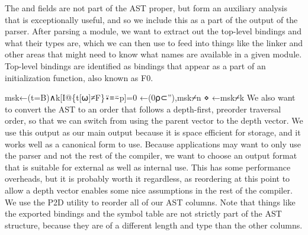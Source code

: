 \documentclass{article}%
\begin{document}
The {\Tt{}\nwendquote} and {\Tt{}\nwendquote} fields are not part of the AST proper, 
but form an auxiliary analysis that is exceptionally useful,
and so we include this as a part of the output of the parser.
After parsing a module, we want to extract out the top-level 
bindings and what their types are,
which we can then use to feed into things like the linker 
and other areas that might need to know what names are available
in a given module.
Top-level bindings are identified as bindings that appear as a 
part of an initialization function, also known as {\Tt{}F0\nwendquote}.

\nwenddocs{}\endmoddef\nwstartdeflinemarkup{}\nwenddeflinemarkup
msk←(t=B)∧k[I@\{t[⍵]≠F\}⍣≡⍨p]=0
←(0⍴⊂''),msk⌿n ⋄ ←msk⌿k
\eatline
{}\nwendcode{}\nwdocspar
We also want to convert the AST to an order that follows a 
depth-first, preorder traversal order, 
so that we can switch from using the parent vector to the depth
vector.
We use this output as our main output because it is space efficient
for storage, and it works well as a canonical form to use.
Because applications may want to only use the parser and not the 
rest of the compiler, 
we want to choose an output format that is suitable for external 
as well as internal use.
This has some performance overheads,
but it is probably worth it regardless,
as reordering at this point to allow a depth vector enables some 
nice assumptions in the rest of the compiler.
We use the {\Tt{}P2D\nwendquote} utility to reorder all of our AST columns.
Note that things like the exported bindings and the symbol table 
are not strictly part of the AST structure, because they are of a 
different length and type than the other columns.
\end{document}
